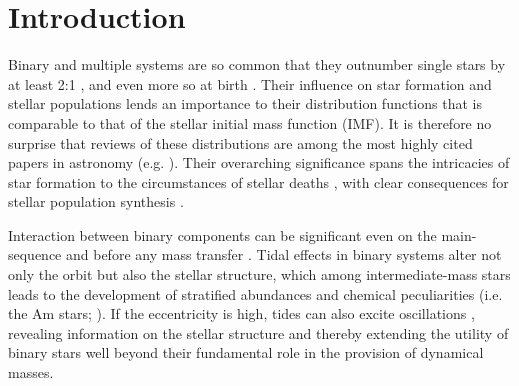 \documentclass[a4paper,fleqn,usenatbib]{mnras}
\begin{document}

\section{Introduction}
\label{sec:intro}


Binary and multiple systems are so common that they outnumber single stars by at least 2:1 \citep{duchene&kraus2013,guszejnovetal2017}, and even more so at birth \citep{ghezetal1993}. Their influence on star formation and stellar populations lends an importance to their distribution functions that is comparable to that of the stellar initial mass function (IMF). It is therefore no surprise that reviews of these distributions are among the most highly cited papers in astronomy (e.g. \citealt{duquennoy&mayor1991}). Their overarching significance spans the intricacies of star formation \citep{bate&bonnell1997, white&ghez2001} to the circumstances of stellar deaths \citep{narayanetal1992, hillebrandt&niemeyer2000, abbottetal2016}, with clear consequences for stellar population synthesis \citep{zhangetal2005}.

Interaction between binary components can be significant even on the main-sequence and before any mass transfer \citep{zahn1977,demarco&izzard2017}. Tidal effects in binary systems alter not only the orbit but also the stellar structure, which among intermediate-mass stars leads to the development of stratified abundances and chemical peculiarities (i.e. the Am stars; \citealt{abt1967,baglinetal1973}). If the eccentricity is high, tides can also excite oscillations \citep{willems2003,welshetal2011,fuller2017,hambletonetal2017}, revealing information on the stellar structure and thereby extending the utility of binary stars well beyond their fundamental role in the provision of dynamical masses.
\end{document}
